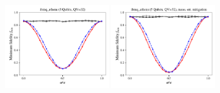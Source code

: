 \documentclass[a4paper]{article}
\begin{document}
\begin{figure}[H]
	\includegraphics[width=0.4\textwidth]{fmin_qc7_mit1}
	\includegraphics[width=0.4\textwidth]{fmin_qc7_mit0}
\end{figure}
\end{document}
